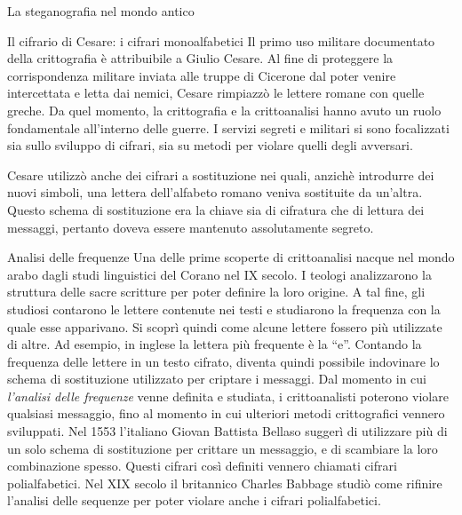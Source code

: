 \documentclass[final,hyperref={pdfpagelabels=false}]{beamer}
\begin{document}
\begin{frame}{}
\begin{columns}[t]
\begin{column}{.3\linewidth}
\begin{block}{La steganografia nel mondo antico}
        \end{block}
        \begin{block}{Il cifrario di Cesare: i cifrari monoalfabetici}
          Il primo uso militare documentato della crittografia è attribuibile a Giulio Cesare. Al fine di proteggere la corrispondenza militare inviata alle truppe di Cicerone dal poter venire intercettata e letta dai nemici, Cesare rimpiazzò le lettere romane con quelle greche. Da quel momento, la crittografia e la crittoanalisi hanno avuto un ruolo fondamentale all'interno delle guerre. I servizi segreti e militari si sono focalizzati sia sullo sviluppo di cifrari, sia su metodi per violare quelli degli avversari. \par
          Cesare utilizzò anche dei cifrari a sostituzione nei quali, anzichè introdurre dei nuovi simboli, una lettera dell'alfabeto romano veniva sostituite da un'altra. Questo schema di sostituzione era la chiave sia di cifratura che di lettura dei messaggi, pertanto doveva essere mantenuto assolutamente segreto.
        \end{block}

        \begin{block}{Analisi delle frequenze}
          Una delle prime scoperte di crittoanalisi nacque nel mondo arabo dagli studi linguistici del Corano nel IX secolo. I teologi analizzarono la struttura delle sacre scritture per poter definire la loro origine. A tal fine, gli studiosi contarono le lettere contenute nei testi e studiarono la frequenza con la quale esse apparivano. Si scoprì quindi come alcune lettere fossero più utilizzate di altre. Ad esempio, in inglese la lettera più frequente è la ``e''. Contando la frequenza delle lettere in un testo cifrato, diventa quindi possibile indovinare lo schema di sostituzione utilizzato per criptare i messaggi. Dal momento in cui {\em l'analisi delle frequenze} venne definita e studiata, i crittoanalisti poterono violare qualsiasi messaggio, fino al momento in cui ulteriori metodi crittografici vennero sviluppati. Nel 1553 l'italiano Giovan Battista Bellaso suggerì di utilizzare più di un solo schema di sostituzione per crittare un messaggio, e di scambiare la loro combinazione spesso. Questi cifrari così definiti vennero chiamati cifrari polialfabetici. Nel XIX secolo il britannico Charles Babbage studiò come rifinire l'analisi delle sequenze per poter violare anche i cifrari polialfabetici.
        \end{block}


\end{column}
\end{columns}
\end{frame}
\end{document}
